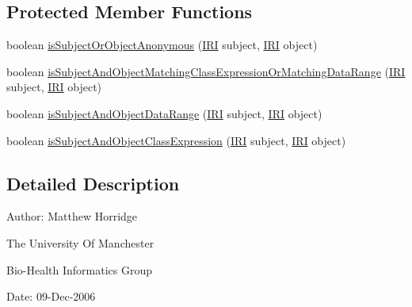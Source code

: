 \subsection*{Protected Member Functions}
\begin{DoxyCompactItemize}
\item 
boolean \hyperlink{classorg_1_1coode_1_1owlapi_1_1rdfxml_1_1parser_1_1_abstract_resource_triple_handler_a883c5419cfc3de13350a506aaefc8dfd}{is\-Subject\-Or\-Object\-Anonymous} (\hyperlink{classorg_1_1semanticweb_1_1owlapi_1_1model_1_1_i_r_i}{I\-R\-I} subject, \hyperlink{classorg_1_1semanticweb_1_1owlapi_1_1model_1_1_i_r_i}{I\-R\-I} object)
\item 
boolean \hyperlink{classorg_1_1coode_1_1owlapi_1_1rdfxml_1_1parser_1_1_abstract_resource_triple_handler_a9fe8419d1633e27127d91433cfe34013}{is\-Subject\-And\-Object\-Matching\-Class\-Expression\-Or\-Matching\-Data\-Range} (\hyperlink{classorg_1_1semanticweb_1_1owlapi_1_1model_1_1_i_r_i}{I\-R\-I} subject, \hyperlink{classorg_1_1semanticweb_1_1owlapi_1_1model_1_1_i_r_i}{I\-R\-I} object)
\item 
boolean \hyperlink{classorg_1_1coode_1_1owlapi_1_1rdfxml_1_1parser_1_1_abstract_resource_triple_handler_aa3071d09f2b95a9be2ae085568d6e4ed}{is\-Subject\-And\-Object\-Data\-Range} (\hyperlink{classorg_1_1semanticweb_1_1owlapi_1_1model_1_1_i_r_i}{I\-R\-I} subject, \hyperlink{classorg_1_1semanticweb_1_1owlapi_1_1model_1_1_i_r_i}{I\-R\-I} object)
\item 
boolean \hyperlink{classorg_1_1coode_1_1owlapi_1_1rdfxml_1_1parser_1_1_abstract_resource_triple_handler_a82688727ad8a5b60d8a05ff19b025629}{is\-Subject\-And\-Object\-Class\-Expression} (\hyperlink{classorg_1_1semanticweb_1_1owlapi_1_1model_1_1_i_r_i}{I\-R\-I} subject, \hyperlink{classorg_1_1semanticweb_1_1owlapi_1_1model_1_1_i_r_i}{I\-R\-I} object)
\end{DoxyCompactItemize}


\subsection{Detailed Description}
Author\-: Matthew Horridge\par
 The University Of Manchester\par
 Bio-\/\-Health Informatics Group\par
 Date\-: 09-\/\-Dec-\/2006\par
\par
 

